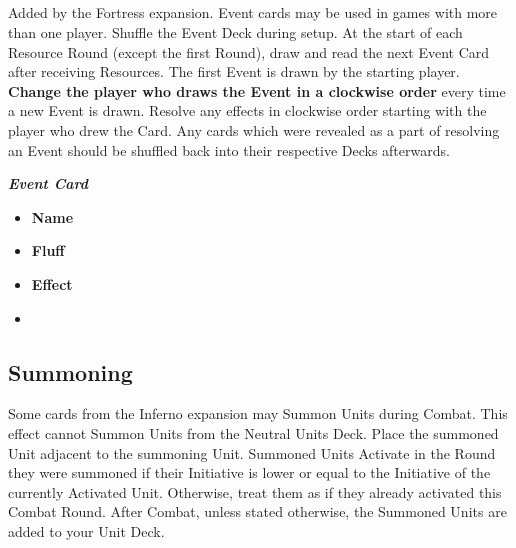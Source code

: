 \begin{multicols*}{2}
\vspace*{\fill}
\columnbreak
\subsection*{}
Added by the Fortress expansion.
Event cards may be used in games with more than one player.
Shuffle the Event Deck during setup.
At the start of each Resource Round (except the first Round), draw and read the next Event Card after receiving Resources.
The first Event is drawn by the starting player.
\textbf{Change the player who draws the Event in a clockwise order} every time a new Event is drawn.
Resolve any effects in clockwise order starting with the player who drew the Card.
Any cards which were revealed as a part of resolving an Event should be shuffled back into their respective Decks afterwards.

\medskip

\begin{minipage}[h]{\linewidth}
  \vspace{0.1pt}
  \centering
  \begin{scriptsize}
  \end{scriptsize}
  \footnotesize{\textbf{\textit{\textcolor{darkcandyapplered}{Event Card}}}}
  \scriptsize
  \begin{multicols}{2}
    \begin{itemize}
      \item[\textbf{1.}] \textbf{Name}
      \item[\textbf{2.}] \textbf{Fluff}
      \item[\textbf{3.}] \textbf{Effect}
      \item[\textbf{\phantom{.}}] \phantom{.}
    \end{itemize}
  \end{multicols}
\end{minipage}

\subsection*{Summoning}
Some cards from the Inferno expansion may Summon Units during Combat.
This effect cannot Summon Units from the Neutral Units Deck.
Place the summoned Unit adjacent to the summoning Unit.
Summoned Units Activate in the Round they were summoned if their Initiative is lower or equal to the Initiative of the currently Activated Unit.
Otherwise, treat them as if they already activated this Combat Round.
After Combat, unless stated otherwise, the Summoned Units are added to your Unit Deck.


\end{multicols*}
